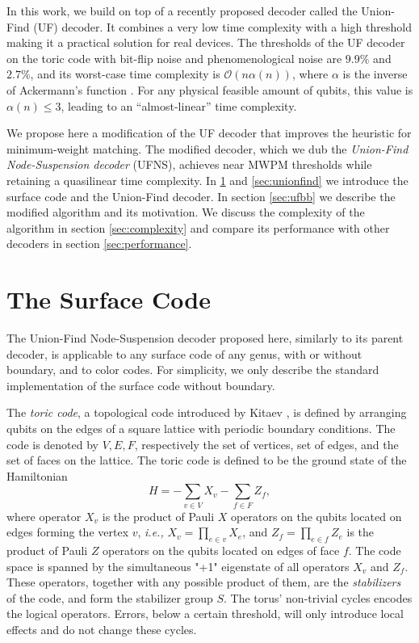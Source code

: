 In this work, we build on top of a recently proposed decoder called the Union-Find (UF) decoder. It combines a very low time complexity with a high threshold \cites{delfosse2017linear, delfosse2017almost} making it a practical solution for real devices. The thresholds of the UF decoder on the toric code with bit-flip noise and phenomenological noise are $9.9\%$ and $2.7\%$, and its worst-case time complexity is $\mathcal{O}(n\alpha(n))$, where $\alpha$ is the inverse of Ackermann's function \cite{tarjan1975efficiency}. For any physical feasible amount of qubits, this value is $\alpha(n) \leq 3$, leading to an ``almost-linear'' time complexity.

We propose here a modification of the UF decoder that improves the heuristic for minimum-weight matching. The modified decoder, which we dub the \emph{Union-Find Node-Suspension decoder} (UFNS), achieves near MWPM thresholds while retaining a quasilinear time complexity. In \ref{sec:surfacecode} and \ref{sec:unionfind} we introduce the surface code and the Union-Find decoder. In section \ref{sec:ufbb} we describe the modified algorithm and its motivation. We discuss the complexity of the algorithm in section \ref{sec:complexity} and compare its performance with other decoders in section \ref{sec:performance}.  

\section{The Surface Code}\label{sec:surfacecode}

The Union-Find Node-Suspension decoder proposed here, similarly to its parent decoder, is applicable to any surface code of any genus, with or without boundary, and to color codes. For simplicity, we only describe the standard implementation of the surface code without boundary.

The \emph{toric code}, a topological code introduced by Kitaev \cite{kitaev2003fault}, is defined by arranging qubits on the edges of a square lattice with periodic boundary conditions. The code is denoted by $V,E,F$, respectively the set of vertices, set of edges, and the set of faces on the lattice. The toric code is defined to be the ground state of the Hamiltonian 
\begin{equation}
    H = -\sum_{v \in V} X_v -\sum_{f \in F} Z_f, 
\end{equation}
where operator $X_v$ is the product of Pauli $X$ operators on the qubits located on edges forming the vertex $v$, \emph{i.e.,} $X_v = \prod_{e \in v} X_e$, and $Z_f = \prod_{e \in f} Z_e$ is the product of Pauli $Z$ operators on the qubits located on edges of face $f$. The code space is spanned by the simultaneous "+1" eigenstate of all operators $X_v$ and $Z_f$. These operators, together with any possible product of them, are the \emph{stabilizers} of the code, and form the stabilizer group $S$. The torus' non-trivial cycles encodes the logical operators. Errors, below a certain threshold, will only introduce local effects and do not change these cycles.

